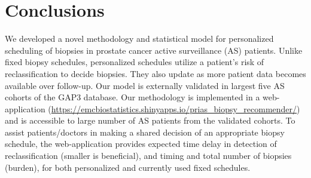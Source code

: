 \section{Conclusions}
We developed a novel methodology and statistical model for personalized scheduling of biopsies in prostate cancer active surveillance (AS) patients. Unlike fixed biopsy schedules, personalized schedules utilize a patient's risk of reclassification to decide biopsies. They also update as more patient data becomes available over follow-up. Our model is externally validated in largest five AS cohorts of the GAP3 database. Our methodology is implemented in a web-application (\url{https://emcbiostatistics.shinyapps.io/prias_biopsy_recommender/}) and is accessible to large number of AS patients from the validated cohorts. To assist patients/doctors in making a shared decision of an appropriate biopsy schedule, the web-application provides expected time delay in detection of reclassification (smaller is beneficial), and timing and total number of biopsies (burden), for both personalized and currently used fixed schedules.